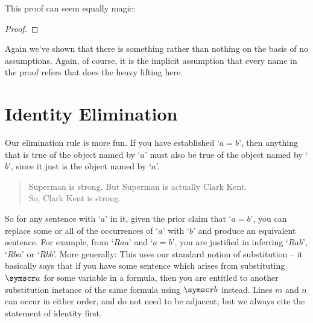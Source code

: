 This proof can seem equally magic: \begin{proof}
	\idi{}
\end{proof} Again we've shown that there is something rather than nothing on the basis of no assumptions. Again, of course, it is the implicit assumption that every name in the proof refers that does the heavy lifting here.


\section{Identity Elimination} %
\label{idelim}


Our elimination rule is more fun. If you have established `$a=b$', then anything that is true of the object named by `$a$' must also be true of the object named by `$b$', since it just is the object named by `$a$'. \begin{quote}
	Superman is strong. But Superman is actually Clark Kent.\\
So, Clark Kent is strong.
\end{quote} So for any sentence with `$a$' in it, given the prior claim that `$a=b$', you can replace some or all of the occurrences of `$a$' with `$b$' and produce an equivalent sentence. For example, from `$Raa$' and `$a = b$', you are justified in inferring `$Rab$', `$Rba$' or `$Rbb$'. More generally:
This uses our standard notion of substitution – it basically says that if you have some sentence which arises from substituting $\meta{a}$ for some variable in a formula, then you are entitled to another substitution instance of the same formula using $\meta{b}$ instead. 
 Lines $m$ and $n$ can occur in either order, and do not need to be adjacent, but we always cite the statement of identity first. 

